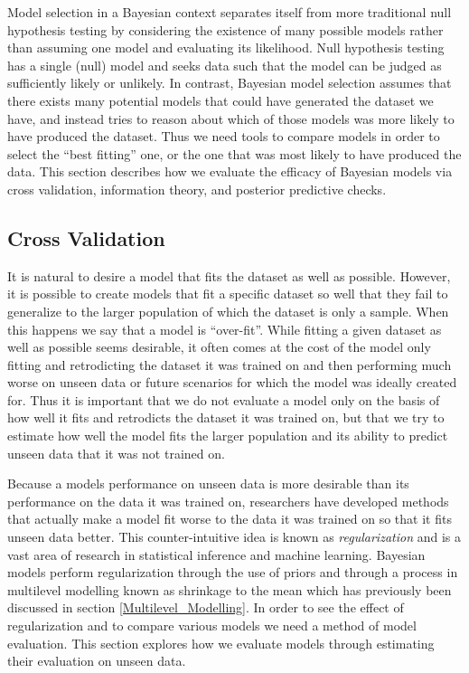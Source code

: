 Model selection in a Bayesian context separates itself from more traditional null hypothesis testing by considering the existence of many possible models rather than assuming one model and evaluating its likelihood. Null hypothesis testing has a single (null) model and seeks data such that the model can be judged as sufficiently likely or unlikely. In contrast, Bayesian model selection assumes that there exists many potential models that could have generated the dataset we have, and instead tries to reason about which of those models was more likely to have produced the dataset. Thus we need tools to compare models in order to select the ``best fitting'' one, or the one that was most likely to have produced the data. This section describes how we evaluate the efficacy of Bayesian models via cross validation, information theory, and posterior predictive checks.

\subsection*{Cross Validation}

It is natural to desire a model that fits the dataset as well as possible. However, it is possible to create models that fit a specific dataset so well that they fail to generalize to the larger population of which the dataset is only a sample. When this happens we say that a model is ``over-fit''. While fitting a given dataset as well as possible seems desirable, it often comes at the cost of the model only fitting and retrodicting the dataset it was trained on and then performing much worse on unseen data or future scenarios for which the model was ideally created for. Thus it is important that we do not evaluate a model only on the basis of how well it fits and retrodicts the dataset it was trained on, but that we try to estimate how well the model fits the larger population and its ability to predict unseen data that it was not trained on.

Because a models performance on unseen data is more desirable than its performance on the data it was trained on, researchers have developed methods that actually make a model fit worse to the data it was trained on so that it fits unseen data better. This counter-intuitive idea is known as \textit{regularization} and is a vast area of research in statistical inference and machine learning. Bayesian models perform regularization through the use of priors and through a process in multilevel modelling known as shrinkage to the mean which has previously been discussed in section \ref{Multilevel_Modelling}. In order to see the effect of regularization and to compare various models we need a method of model evaluation. This section explores how we evaluate models through estimating their evaluation on unseen data.

